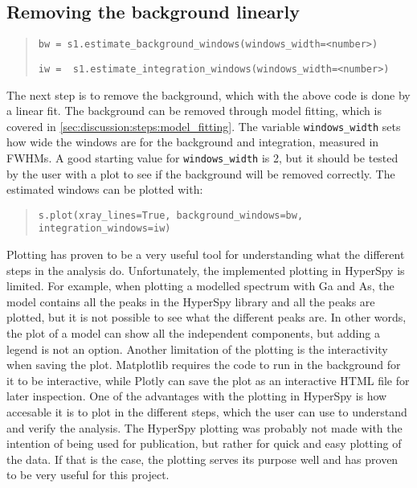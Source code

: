 \subsection{Removing the background linearly}
\label{sec:discussion:steps:background}
\begin{quote}
    \verb|bw = s1.estimate_background_windows(windows_width=<number>)|

    \verb|iw =  s1.estimate_integration_windows(windows_width=<number>)|
\end{quote}

The next step is to remove the background, which with the above code is done by a linear fit.
The background can be removed through model fitting, which is covered in \cref{sec:discussion:steps:model_fitting}.
The variable \verb|windows_width| sets how wide the windows are for the background and integration, measured in FWHMs.
A good starting value for \verb|windows_width| is 2, but it should be tested by the user with a plot to see if the background will be removed correctly.
The estimated windows can be plotted with:

\begin{quote}
    \verb|s.plot(xray_lines=True, background_windows=bw, integration_windows=iw)|
\end{quote}


Plotting has proven to be a very useful tool for understanding what the different steps in the analysis do.
Unfortunately, the implemented plotting in HyperSpy is limited.
For example, when plotting a modelled spectrum with Ga and As, the model contains all the peaks in the HyperSpy library and all the peaks are plotted, but it is not possible to see what the different peaks are.
In other words, the plot of a model can show all the independent components, but adding a legend is not an option.
Another limitation of the plotting is the interactivity when saving the plot.
Matplotlib requires the code to run in the background for it to be interactive, while Plotly can save the plot as an interactive HTML file for later inspection.
One of the advantages with the plotting in HyperSpy is how accesable it is to plot in the different steps, which the user can use to understand and verify the analysis.
The HyperSpy plotting was probably not made with the intention of being used for publication, but rather for quick and easy plotting of the data.
If that is the case, the plotting serves its purpose well and has proven to be very useful for this project.

